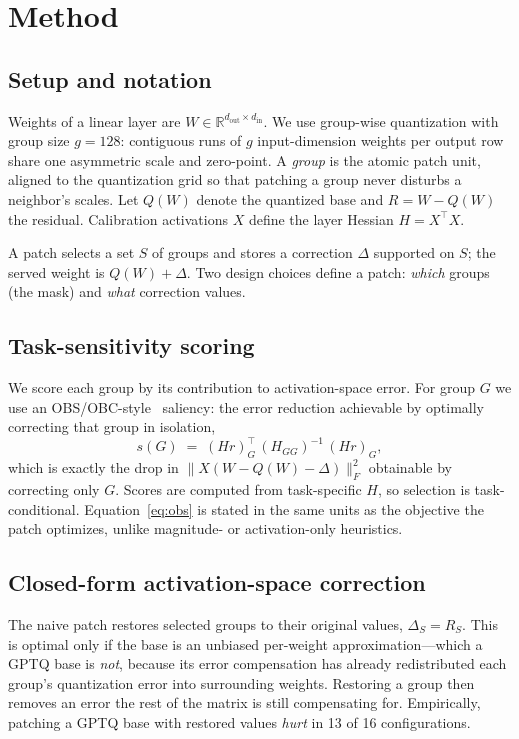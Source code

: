 \documentclass[manuscript, screen, review]{jair}
\begin{document}
\section{Method}
\label{sec:method}

\subsection{Setup and notation}
Weights of a linear layer are $W \in \mathbb{R}^{d_\text{out}\times d_\text{in}}$.
We use group-wise quantization with group size $g{=}128$: contiguous runs of
$g$ input-dimension weights per output row share one asymmetric scale and
zero-point. A \emph{group} is the atomic patch unit, aligned to the
quantization grid so that patching a group never disturbs a neighbor's
scales. Let $Q(W)$ denote the quantized base and $R = W - Q(W)$ the residual.
Calibration activations $X$ define the layer Hessian $H = X^\top X$.

A patch selects a set $S$ of groups and stores a correction $\Delta$ supported
on $S$; the served weight is $Q(W) + \Delta$. Two design choices define a
patch: \emph{which} groups (the mask) and \emph{what} correction values.

\subsection{Task-sensitivity scoring}
We score each group by its contribution to activation-space error. For group
$G$ we use an OBS/OBC-style~\cite{lecun1989obd,frantar2022gptq} saliency: the
error reduction achievable by optimally correcting that group in isolation,
\begin{equation}
  s(G) \;=\; (Hr)_G^\top \, (H_{GG})^{-1} \, (Hr)_G,
  \label{eq:obs}
\end{equation}
which is exactly the drop in $\lVert X(W - Q(W) - \Delta)\rVert_F^2$ obtainable
by correcting only $G$. Scores are computed from task-specific $H$, so
selection is task-conditional. Equation~\eqref{eq:obs} is stated in the same
units as the objective the patch optimizes, unlike magnitude- or
activation-only heuristics.

\subsection{Closed-form activation-space correction}
The naive patch restores selected groups to their original values,
$\Delta_S = R_S$. This is optimal only if the base is an unbiased per-weight
approximation---which a GPTQ base is \emph{not}, because its error compensation
has already redistributed each group's quantization error into surrounding
weights. Restoring a group then removes an error the rest of the matrix is
still compensating for. Empirically, patching a GPTQ base with restored values
\emph{hurt} in 13 of 16 configurations.
\end{document}
